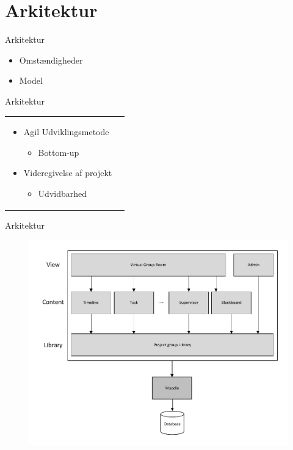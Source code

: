 \section{Arkitektur}

\begin{frame}{Arkitektur}
\begin{itemize}
	\item Omst\ae{}ndigheder
	\item Model
\end{itemize}
\end{frame}


\begin{frame}{Arkitektur}

\begin{tabular}{ p{6cm}  r }
\begin{itemize}
	\item Agil Udviklingsmetode
	\begin{itemize}
		\item Bottom-up  
	\end{itemize}
	\item Videregivelse af projekt
	\begin{itemize}
		\item Udvidbarhed
	\end{itemize}
\end{itemize} 

\end{tabular}



\end{frame}


\begin{frame}{Arkitektur}
\begin{figure}%
\includegraphics[width=\columnwidth]{input/assets/architecture}%
\end{figure}	
\end{frame}